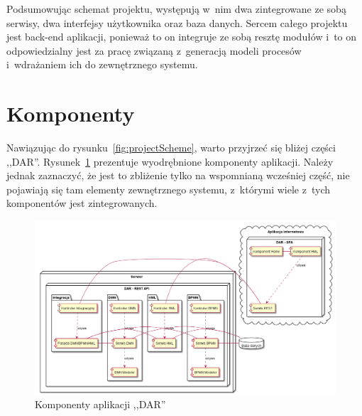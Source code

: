 Podsumowując schemat projektu, występują w~nim dwa zintegrowane ze sobą serwisy, dwa interfejsy użytkownika oraz baza danych. Sercem całego projektu jest back-end aplikacji, ponieważ to on integruje ze sobą resztę modułów i~to on odpowiedzialny jest za pracę związaną z~generacją modeli procesów i~wdrażaniem ich do zewnętrznego systemu.  

\section{Komponenty}
\label{sec:komponenty}
Nawiązując do rysunku~\ref{fig:projectScheme}, warto przyjrzeć się bliżej części ,,DAR''. Rysunek~\ref{fig:components} prezentuje wyodrębnione komponenty aplikacji. Należy jednak zaznaczyć, że jest to zbliżenie tylko na wspomnianą wcześniej część, nie pojawiają się tam elementy zewnętrznego systemu, z~którymi wiele z~tych komponentów jest zintegrowanych. 
\begin{figure}
    \centering
    \includegraphics[width=\textwidth]{./assets/components.png}
    \caption{Komponenty aplikacji ,,DAR''}
    \label{fig:components}
\end{figure} 


